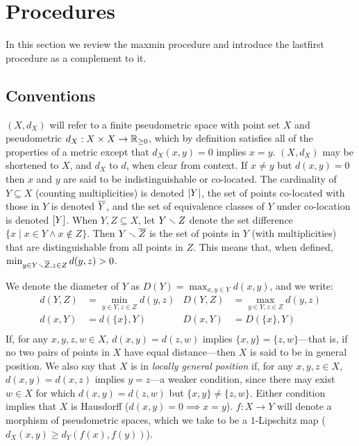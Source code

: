 \documentclass[
]{article}
\begin{document}
\hypertarget{procedures}{%
\section{Procedures}\label{procedures}}

\label{sec:procedures}

In this section we review the maxmin procedure and introduce the
lastfirst procedure as a complement to it.

\hypertarget{conventions}{%
\subsection{Conventions}\label{conventions}}

\((X, d_X)\) will refer to a finite pseudometric space with point set
\(X\) and pseudometric \(d_X:X\times X\to\mathbb{R}_{\geq 0}\), which by
definition satisfies all of the properties of a metric except that
\(d_X(x,y)=0\) implies \(x=y\). \((X,d_X)\) may be shortened to \(X\),
and \(d_X\) to \(d\), when clear from context. If \(x\neq y\) but
\(d(x,y)=0\) then \(x\) and \(y\) are said to be indistinguishable or
co-located. The cardinality of \(Y\subseteq X\) (counting
multiplicities) is denoted \(\lvert Y\rvert\), the set of points co-located
with those in \(Y\) is denoted \(\overline{Y}\), and the set of equivalence
classes of \(Y\) under co-location is denoted \([Y]\). When
\(Y,Z\subseteq X\), let \(Y\smallsetminus Z\) denote the set difference
\(\{x \mid x \in Y \wedge x \notin Z\}\). Then \(Y \smallsetminus \overline{Z}\) is the
set of points in \(Y\) (with multiplicities) that are distinguishable
from all points in \(Z\). This means that, when defined,
\(\min_{y\in Y\smallsetminus \overline{Z},z\in Z}{d(y, z)}>0\).

We denote the diameter of \(Y\) as \(D(Y)=\max_{x,y\in Y}{d(x,y)}\), and
we write: \begin{align*}
d(Y,Z) &= \min_{y\in Y,z\in Z}{d(y,z)} & D(Y,Z) &= \max_{y\in Y,z\in Z}{d(y,z)} \\
d(x,Y) &= d(\{x\},Y)                   & D(x,Y) &= D(\{x\},Y) \\
\end{align*} If, for any \(x,y,z,w \in X\), \(d(x,y)=d(z,w)\) implies
\(\{x,y\}=\{z,w\}\)---that is, if no two pairs of points in \(X\) have
equal distance---then \(X\) is said to be in general position. We also
say that \(X\) is in \emph{locally general position} if, for any
\(x,y,z \in X\), \(d(x,y)=d(x,z)\) implies \(y=z\)---a weaker condition,
since there may exist \(w \in X\) for which \(d(x,y)=d(z,w)\) but
\(\{x,y\}\neq\{z,w\}\). Either condition implies that \(X\) is Hausdorff
(\(d(x,y)=0\implies x=y\)). \(f:X \to Y\) will denote a morphism of
pseudometric spaces, which we take to be a \(1\)-Lipschitz map
(\(d_X(x,y)\geq d_Y(f(x),f(y))\)).
\end{document}
